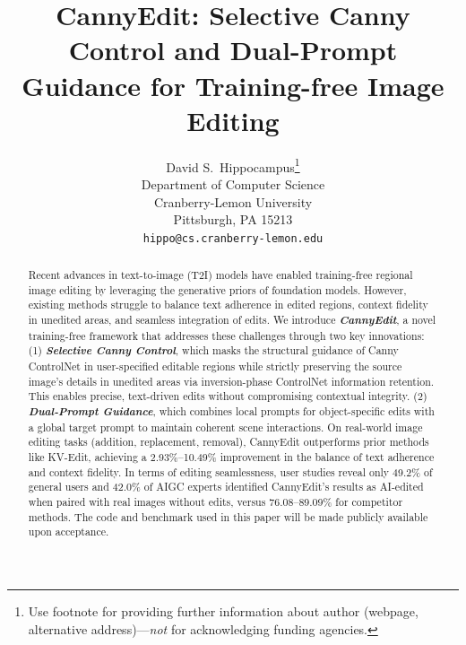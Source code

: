 \documentclass{article}
\title{CannyEdit: Selective Canny Control and Dual-Prompt Guidance for Training-free Image Editing}
\author{%
  David S.~Hippocampus\thanks{Use footnote for providing further information
    about author (webpage, alternative address)---\emph{not} for acknowledging
    funding agencies.} \\
  Department of Computer Science\\
  Cranberry-Lemon University\\
  Pittsburgh, PA 15213 \\
  \texttt{hippo@cs.cranberry-lemon.edu} \\
}
\begin{document}
\maketitle


\begin{abstract}
Recent advances in text-to-image (T2I) models have enabled training-free regional image editing by leveraging the generative priors of foundation models. However, existing methods struggle to balance text adherence in edited regions, context fidelity in unedited areas, and seamless integration of edits. We introduce \textbf{\textit{CannyEdit}}, a novel training-free framework that addresses these challenges through two key innovations: (1) \textbf{\textit{Selective Canny Control}}, which masks the structural guidance of Canny ControlNet in user-specified editable regions while strictly preserving the source image’s details in unedited areas via inversion-phase ControlNet information retention. This enables precise, text-driven edits without compromising contextual integrity. (2) \textbf{\textit{Dual-Prompt Guidance}}, which combines local prompts for object-specific edits with a global target prompt to maintain coherent scene interactions. On real-world image editing tasks (addition, replacement, removal), CannyEdit outperforms prior methods like KV-Edit, achieving a 2.93\%–10.49\% improvement in the balance of text adherence and context fidelity. In terms of editing seamlessness, user studies reveal only 49.2\% of general users and 42.0\% of AIGC experts identified CannyEdit's results as AI-edited when paired with real images without edits, versus 76.08–89.09\% for competitor methods. The code and benchmark used in this paper will be made publicly available upon acceptance.
\end{abstract}
\end{document}
